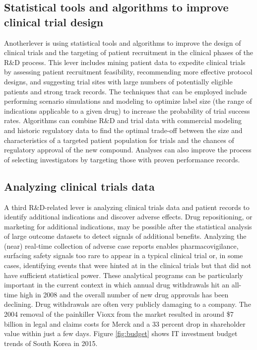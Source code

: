 \documentclass[twocolumn]{article}
\begin{document}
\subsection{Statistical tools and algorithms to improve clinical trial design}
Anotherlever is using statistical tools and algorithms to improve the design of clinical trials and the targeting of patient recruitment in the clinical phases of the R\&D process. This lever includes mining patient data to expedite clinical trials by assessing patient recruitment feasibility, recommending more effective protocol designs, and suggesting trial sites with large numbers of potentially eligible patients and strong track records. The techniques that can be employed include performing scenario simulations and modeling to optimize label size (the range of indications applicable to a given drug) to increase the probability of trial success rates. Algorithms can combine R\&D and trial data with commercial modeling and historic regulatory data to find the optimal trade-off between the size and characteristics of a targeted patient population for trials and the chances of regulatory approval of the new compound. Analyses can also improve the process of selecting investigators by targeting those with proven performance records.

\subsection{Analyzing clinical trials data}
A third R\&D-related lever is analyzing clinical trials data and patient records to identify additional indications and discover adverse effects. Drug repositioning, or marketing for additional indications, may be possible after the statistical analysis of large outcome datasets to detect signals of additional benefits. Analyzing the (near) real-time collection of adverse case reports enables pharmacovigilance, surfacing safety signals too rare to appear in a typical clinical trial or, in some cases, identifying events that were hinted at in the clinical trials but that did not have sufficient statistical power.
These analytical programs can be particularly important in the current context in which annual drug withdrawals hit an all-time high in 2008 and the overall number of new drug approvals has been declining. Drug withdrawals are often very publicly damaging to a company. The 2004 removal of the painkiller Vioxx from the market resulted in around \$7 billion in legal and claims costs for Merck and a 33 percent drop in shareholder value within just a few days. Figure \ref{fig:budget} shows IT investment budget trends of South Korea in 2015.
\end{document}
